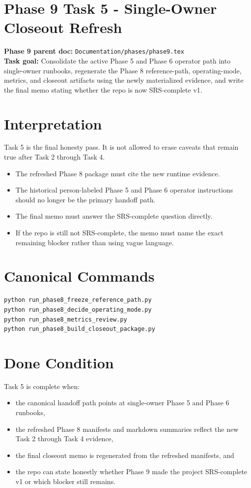 \documentclass{article}
\begin{document}
\section*{Phase 9 Task 5 - Single-Owner Closeout Refresh}

\textbf{Phase 9 parent doc:} \texttt{Documentation/phases/phase9.tex}\\
\textbf{Task goal:} Consolidate the active Phase 5 and Phase 6 operator path into single-owner runbooks, regenerate the Phase 8 reference-path, operating-mode, metrics, and closeout artifacts using the newly materialized evidence, and write the final memo stating whether the repo is now SRS-complete v1.

\section*{Interpretation}
Task 5 is the final honesty pass. It is not allowed to erase caveats that remain true after Task 2 through Task 4.
\begin{itemize}
\item The refreshed Phase 8 package must cite the new runtime evidence.
\item The historical person-labeled Phase 5 and Phase 6 operator instructions should no longer be the primary handoff path.
\item The final memo must answer the SRS-complete question directly.
\item If the repo is still not SRS-complete, the memo must name the exact remaining blocker rather than using vague language.
\end{itemize}

\section*{Canonical Commands}
\begin{verbatim}
python run_phase8_freeze_reference_path.py
python run_phase8_decide_operating_mode.py
python run_phase8_metrics_review.py
python run_phase8_build_closeout_package.py
\end{verbatim}

\section*{Done Condition}
Task 5 is complete when:
\begin{itemize}
\item the canonical handoff path points at single-owner Phase 5 and Phase 6 runbooks,
\item the refreshed Phase 8 manifests and markdown summaries reflect the new Task 2 through Task 4 evidence,
\item the final closeout memo is regenerated from the refreshed manifests, and
\item the repo can state honestly whether Phase 9 made the project SRS-complete v1 or which blocker still remains.
\end{itemize}
\end{document}
